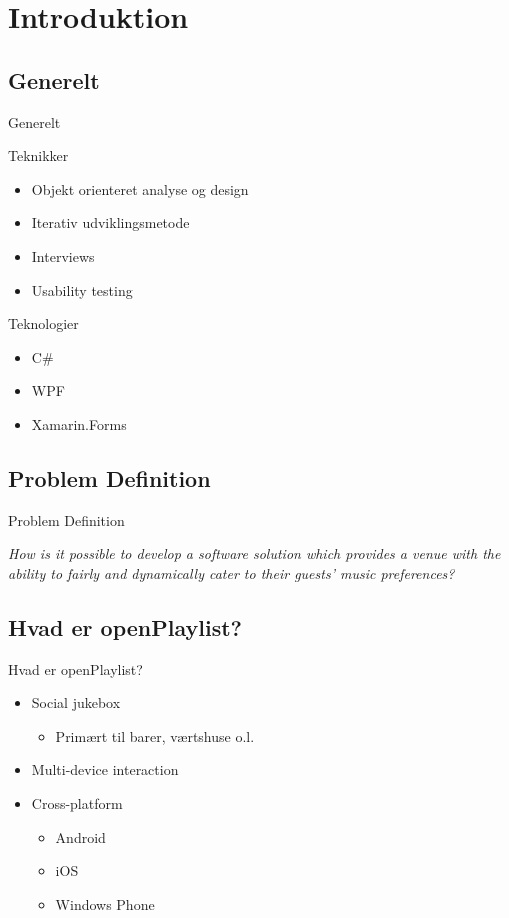 \section{Introduktion}

\subsection{Generelt}
\begin{frame}{Generelt}
	\begin{multicols}{2}
		Teknikker
		\begin{itemize}
			\item Objekt orienteret analyse og design
			\item Iterativ udviklingsmetode
			\item Interviews
			\item Usability testing
		\end{itemize}
		
		\columnbreak
		
		Teknologier
		\begin{itemize}
			\item C\#
			\item WPF
			\item Xamarin.Forms
		\end{itemize}
	\end{multicols}
\end{frame}

\subsection{Problem Definition}
\begin{frame}{Problem Definition}
	\begin{center}
		\textit{How is it possible to develop a software solution which provides a venue with the ability to fairly and dynamically cater to their guests' music preferences?}
	\end{center}
\end{frame}

\subsection{Hvad er openPlaylist?}
\begin{frame}{Hvad er openPlaylist?}
	\begin{itemize}
		\item Social jukebox
		\begin{itemize}
			\item Primært til barer, værtshuse o.l.
		\end{itemize}
		\item Multi-device interaction
		\item Cross-platform
		\begin{itemize}
			\item Android
			\item iOS
			\item Windows Phone
		\end{itemize}
	\end{itemize}
\end{frame}

